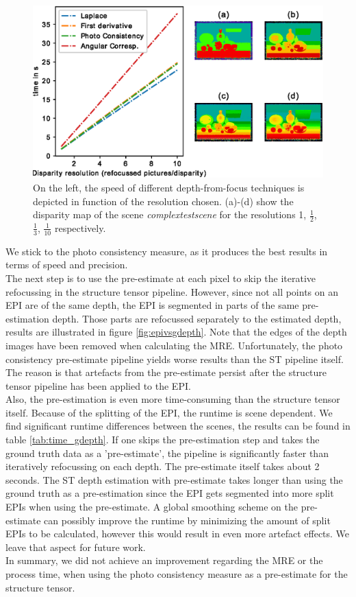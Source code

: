 \documentclass  [
  paper    = a4,
  BCOR     = 10mm,
  twoside,
  fontsize = 12pt,
  fleqn,
  toc      = bibnumbered,
  toc      = listofnumbered,
  numbers  = noendperiod,
  headings = normal,
  listof   = leveldown,
  version  = 3.03
]                                       {scrreprt}
\begin{document}
	 \begin{figure}[h!]
	 	\centering
	 	\includegraphics[width=0.7\linewidth]{images/speeds.eps}
	 	\caption[Speed of different depth-from-focus techniques]{ On the left, the speed of different depth-from-focus techniques is depicted in function of the resolution chosen. (a)-(d) show the disparity map of the scene \textit{complextestscene} for the resolutions 1, $\frac{1}{2}$, $\frac{1}{3}$, $\frac{1}{10}$ respectively.}
	 	\label{fig:speeds}
	 \end{figure}
 	We stick to the photo consistency measure, as it produces the best results in terms of speed and precision.\\
 	The next step is to use the pre-estimate at each pixel to skip the iterative refocussing in the structure tensor pipeline. However, since not all points on an EPI are of the same depth, the EPI is segmented in parts of the same pre-estimation depth. Those parts are refocussed separately to the estimated depth, results are illustrated in figure \ref{fig:epivsgdepth}. Note that the edges of the depth images have been removed when calculating the MRE. 
 	Unfortunately, the photo consistency pre-estimate pipeline yields worse results than the ST pipeline itself. The reason is that artefacts from the pre-estimate persist after the structure tensor pipeline has been applied to the EPI.\\
 	Also, the pre-estimation is even more time-consuming than the structure tensor itself. Because of the splitting of the EPI, the runtime is scene dependent. We find significant runtime differences between the scenes, the results can be found in table \ref{tab:time_gdepth}. If one skips the pre-estimation step and takes the ground truth data as a 'pre-estimate', the pipeline is significantly faster than iteratively refocussing on each depth. The pre-estimate itself takes about 2 seconds. The ST depth estimation with pre-estimate takes longer than using the ground truth as a pre-estimation since the EPI gets segmented into more split EPIs when using the pre-estimate. A global smoothing scheme on the pre-estimate can possibly improve the runtime by minimizing the amount of split EPIs to be calculated, however this would result in even more artefact effects. We leave that aspect for future work.\\ In summary, we did not achieve an improvement regarding the MRE or the process time, when using the photo consistency measure as a pre-estimate for the structure tensor. 
\end{document}
